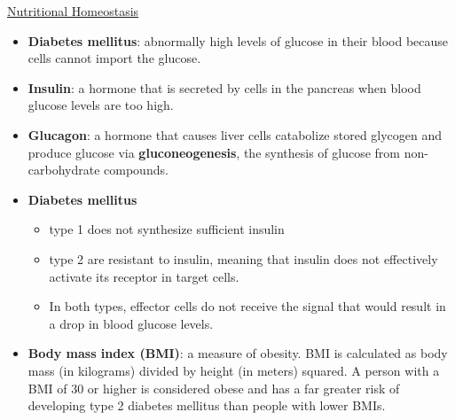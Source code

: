 \documentclass[12pt,letterpaper]{article}
\begin{document}
\hypertarget{41.4}{}
\begin{secbox}{\hyperlink{41}{Nutritional Homeostasis}}{
    \begin{itemize}
        \item \textbf{Diabetes mellitus}: abnormally high levels of glucose in their blood because cells cannot import the glucose. 
        \item \textbf{Insulin}: a hormone that is secreted by cells in the pancreas when blood glucose levels are too high.
        \item \textbf{Glucagon}: a hormone that causes liver cells catabolize stored glycogen and produce glucose via \textbf{gluconeogenesis}, the synthesis of glucose from non-carbohydrate compounds.
        \item \textbf{Diabetes mellitus}
            \begin{itemize} 
                \item type 1 does not synthesize sufficient insulin 
                \item type 2 are resistant to insulin, meaning that insulin does not effectively activate its receptor in target cells. 
                \item In both types, effector cells do not receive the signal that would result in a drop in blood glucose levels.
            \end{itemize}
        \item \textbf{Body mass index (BMI)}: a measure of obesity. BMI is calculated as body mass (in kilograms) divided by height (in meters) squared. A person with a BMI of 30 or higher is considered obese and has a far greater risk of developing type 2 diabetes mellitus than people with lower BMIs.
    \end{itemize}
}\end{secbox}
\end{document}
